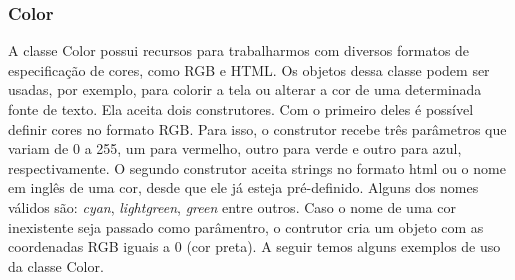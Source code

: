 \subsubsection{Color}
%
%
A classe Color possui recursos para trabalharmos com diversos formatos de especificação de cores, como RGB e HTML. Os objetos dessa classe podem ser usadas, por exemplo, para colorir a tela ou alterar a cor de uma determinada fonte de texto. Ela aceita dois construtores. Com o primeiro deles é possível definir cores no formato RGB. Para isso, o construtor recebe três parâmetros que variam de 0 a 255, um para vermelho, outro para verde e outro para azul, respectivamente. O segundo construtor aceita strings no formato html ou o nome em inglês de uma cor, desde que ele já esteja pré-definido. Alguns dos nomes válidos são: \textit{cyan}, \textit{lightgreen}, \textit{green} entre outros. Caso o nome de uma cor inexistente seja passado como parâmentro, o contrutor cria um objeto com as coordenadas RGB iguais a 0 (cor preta). A seguir temos alguns exemplos de uso da classe Color.
%
%

%
%
